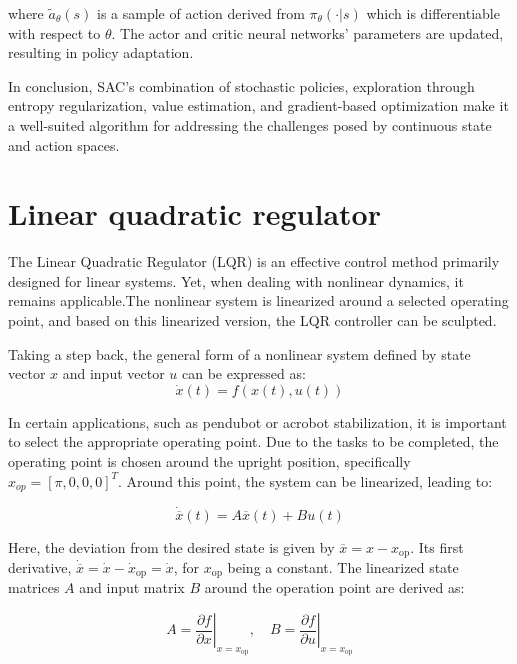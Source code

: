where \(\widetilde{a}_{\theta}(s)\) is a sample of action derived from \(\pi_\theta(\cdot|s)\) which is differentiable with respect to \(\theta\). The actor and critic neural networks' parameters are updated, resulting in policy adaptation.

In conclusion, SAC's combination of stochastic policies, exploration through
entropy regularization, value estimation, and gradient-based optimization make
it a well-suited algorithm for addressing the challenges posed by continuous
state and action spaces.

\section{Linear quadratic regulator}
The Linear Quadratic Regulator (LQR)\cite{lehtomaki1981robustness} is an effective control method primarily designed for linear systems. Yet, when dealing with nonlinear dynamics, it remains applicable.The nonlinear system is linearized around a selected operating point, and based on this linearized version, the LQR controller can be sculpted.

Taking a step back, the general form of a nonlinear system defined by state vector \(x\) and input vector \(u\) can be expressed as:
\begin{equation}
 \dot{x}(t) = f(x(t), u(t))
\end{equation}


In certain applications, such as pendubot or acrobot stabilization, it is important to select the appropriate operating point. Due to the tasks to be completed, the operating point is chosen around the upright position, specifically \(x_{op} = [\pi,0,0,0]^T\). Around this point, the system can be linearized, leading to:

\begin{equation}
\dot{\overline{x}}(t) = A \overline{x}(t) + B u(t)
\end{equation}

Here, the deviation from the desired state is given by \(\overline{x} = x - x_{\text{op}}\). Its first derivative, \(\dot{\overline{x}} = \dot{x} - \dot{x}_{\text{op}} = \dot{x}\), for \(x_{\text{op}}\) being a constant. The linearized state matrices \(A\) and input matrix \(B\) around the operation point are derived as:

\begin{equation}
A = \left.\frac{\partial f}{\partial x}\right|_{x = x_{\text{op}}}, \quad B = \left.\frac{\partial f}{\partial u}\right|_{x = x_{\text{op}}}
\end{equation}

